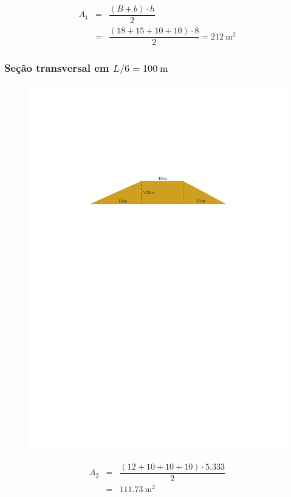 \documentclass[a4paper, 12pt, brazilian]{article}
\begin{document}
	
	\begin{eqnarray}
		A_{1}&=&\dfrac{(B+b)\cdot h}{2}\\
		&=&\dfrac{(18+15+10+10)\cdot 8}{2}
		=\SI{212}{\meter^{2}}
	\end{eqnarray}
	
	
	\subsubsection{Seção transversal em $L/6=\SI{100}{\meter}$}
	
	\begin{figure}[H]
		\centering
		\includegraphics[width=0.9\linewidth]{images/lpersix}
		\label{fig:lpersix}
	\end{figure}
	
	
	\begin{eqnarray}
		A_{2}&=&\dfrac{(12+10+10+10)\cdot 5.333}{2}\\
		&=&\SI{111.73}{\meter^{2}}
	\end{eqnarray}
	
\end{document}
